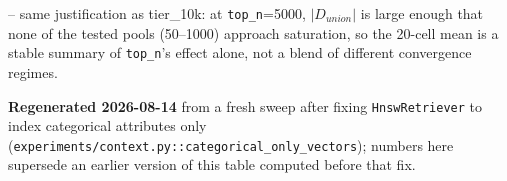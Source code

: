 \begin{table}[t]
\begin{threeparttable}
\begin{tablenotes}
  -- same justification as tier\_10k: at \texttt{top\_n}=5000, $|D_{union}|$ is large enough that
  none of the tested pools (50--1000) approach saturation, so the 20-cell mean is a stable summary
  of \texttt{top\_n}'s effect alone, not a blend of different convergence regimes.
\item[d] \textbf{Regenerated 2026-08-14} from a fresh sweep after fixing \texttt{HnswRetriever} to
  index categorical attributes only (\texttt{experiments/context.py::categorical\_only\_vectors});
  numbers here supersede an earlier version of this table computed before that fix.
\end{tablenotes}
\end{threeparttable}
\end{table}
